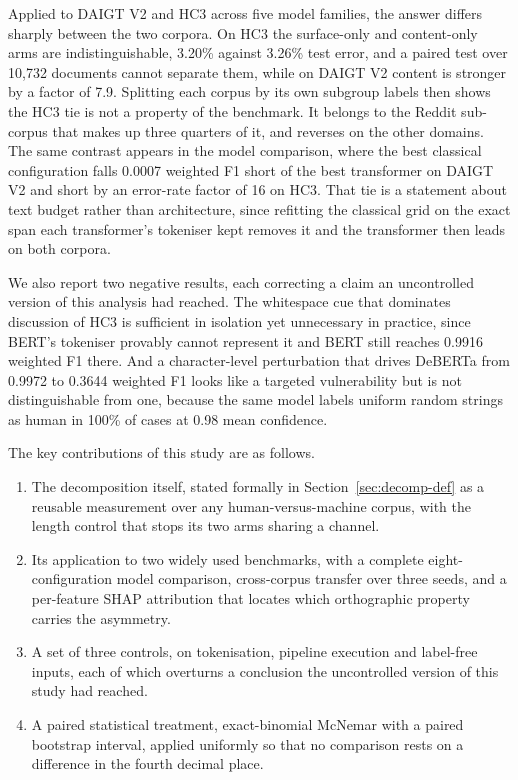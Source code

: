 Applied to DAIGT V2 and HC3 across five model families, the answer differs sharply between the two corpora. On HC3 the surface-only and content-only arms are indistinguishable, 3.20\% against 3.26\% test error, and a paired test over 10,732 documents cannot separate them, while on DAIGT V2 content is stronger by a factor of 7.9. Splitting each corpus by its own subgroup labels then shows the HC3 tie is not a property of the benchmark. It belongs to the Reddit sub-corpus that makes up three quarters of it, and reverses on the other domains. The same contrast appears in the model comparison, where the best classical configuration falls 0.0007 weighted F1 short of the best transformer on DAIGT V2 and short by an error-rate factor of 16 on HC3. That tie is a statement about text budget rather than architecture, since refitting the classical grid on the exact span each transformer's tokeniser kept removes it and the transformer then leads on both corpora.

We also report two negative results, each correcting a claim an uncontrolled version of this analysis had reached. The whitespace cue that dominates discussion of HC3 is sufficient in isolation yet unnecessary in practice, since BERT's tokeniser provably cannot represent it and BERT still reaches 0.9916 weighted F1 there. And a character-level perturbation that drives DeBERTa from 0.9972 to 0.3644 weighted F1 looks like a targeted vulnerability but is not distinguishable from one, because the same model labels uniform random strings as human in 100\% of cases at 0.98 mean confidence.

The key contributions of this study are as follows.
\begin{enumerate}
    \item The decomposition itself, stated formally in Section~\ref{sec:decomp-def} as a reusable measurement over any human-versus-machine corpus, with the length control that stops its two arms sharing a channel.
    \item Its application to two widely used benchmarks, with a complete eight-configuration model comparison, cross-corpus transfer over three seeds, and a per-feature SHAP attribution that locates which orthographic property carries the asymmetry.
    \item A set of three controls, on tokenisation, pipeline execution and label-free inputs, each of which overturns a conclusion the uncontrolled version of this study had reached.
    \item A paired statistical treatment, exact-binomial McNemar with a paired bootstrap interval, applied uniformly so that no comparison rests on a difference in the fourth decimal place.
\end{enumerate}

